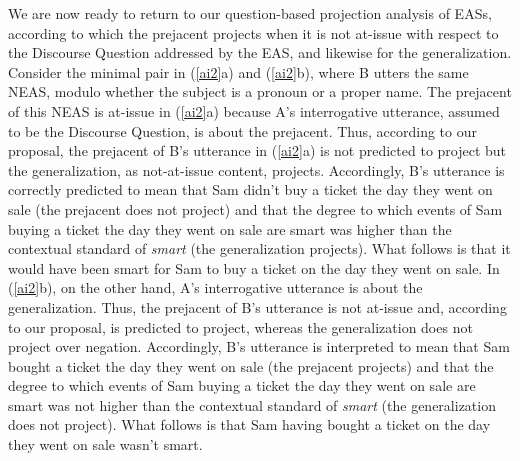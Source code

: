 \documentclass[11pt,fleqn]{article}
\newcommand{\6}{\mbox{$[\hspace*{-.6mm}[$}}
\newcommand{\9}{\mbox{$]\hspace*{-.6mm}]$}}
\begin{document}
We are now ready to return to our question-based projection analysis of EASs, according to which the prejacent projects when it is not at-issue with respect to the Discourse Question addressed by the EAS, and likewise for the generalization. Consider the minimal pair in (\ref{ai2}a) and (\ref{ai2}b), where B utters the same NEAS, modulo whether the subject is a pronoun or a proper name. The prejacent of this NEAS is at-issue in (\ref{ai2}a) because A's interrogative utterance, assumed to be the Discourse Question, is about the prejacent. Thus, according to our proposal, the prejacent of B's utterance in (\ref{ai2}a) is not predicted to project but the generalization, as not-at-issue content, projects. Accordingly, B's utterance is correctly predicted to mean that Sam didn't buy a ticket the day they went on sale (the prejacent does not project) and that the degree to which events of Sam buying a ticket the day they went on sale are smart was higher than the contextual standard of {\em smart} (the generalization projects). What follows is that it would have been smart for Sam to buy a ticket on the day they went on sale. In (\ref{ai2}b), on the other hand, A's interrogative utterance is about the generalization. Thus, the prejacent of B's utterance is not at-issue and, according to our proposal, is predicted to project, whereas the generalization does not project over negation. Accordingly, B's utterance is interpreted to mean that Sam bought a ticket the day they went on sale (the prejacent projects) and that the degree to which events of Sam buying a ticket the day they went on sale are smart was not higher than the contextual standard of {\em smart} (the generalization does not project). What follows is that Sam having bought a ticket on the day they went on sale wasn't smart. 
\end{document}
